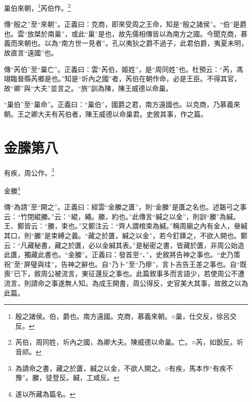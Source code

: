 巢伯來朝，\footnote{殷之諸侯。伯，爵也。南方遠國。克商，慕義來朝。○巢，仕交反，徐呂交反。}芮伯作。\footnote{芮伯，周同姓，圻內之國，為卿大夫。陳威德以命巢。亡。○芮，如銳反。圻音祁。}


{\noindent\zhuan{}\fzbyks 傳“殷之”至“來朝”。正義曰：克商，即來受周之王命，知是“殷之諸侯”。“伯”是爵也。雲“放桀於南巢”，或此“巢”是也，故先儒相傳皆以為南方之國。今聞克商，慕義而來朝也。以為“南方世一見者”。孔以夷狄之爵不過子，此君伯爵，夷夏未明，故直言“遠國”也。 \par}

{\noindent\zhuan{}\fzbyks 傳“芮伯”至“巢亡”。正義曰：雲“芮伯，姬姓”，是“周同姓”也。杜預云：“芮，馮翊臨晉縣芮鄉是也。”知是“圻內之國”者，芮伯在朝作命，必是王臣。不得其官，故“卿”與“大夫”並言之。“旅”訓為陳，陳王威德以命巢。 \par}

{\noindent\shu{}\fzkt “巢伯”至“巢命”。正義曰：“巢伯”，國爵之君，南方遠國也。以克商，乃慕義來朝。王之卿大夫有芮伯者，陳王威德以命巢君。史敘其事，作之篇。 \par}

\section{金縢第八}


有疾，周公作。\footnote{為請命之書，藏之於匱，緘之以金，不欲人開之。○有疾，馬本作“有疾不豫”。縢，徒登反。緘，工咸反。}

金縢\footnote{遂以所藏為篇名。}

{\noindent\zhuan{}\fzbyks 傳“為請”至“開之”。正義曰：經雲“金縢之匱”，則“金縢”是匱之名也。述韔弓之事云：“竹閉緄縢。”云：“緄，繩。縢，約也。”此傳言“緘之以金”，則訓“縢”為緘。王、鄭皆云：“縢，束也。”又鄭注云：“齊人謂棺束為緘。”稱周廟之內有金人，叄緘其口，則“縢”是束縛之義。“藏之於匱，緘之以金”，若今釘鐷之，不欲人開也。鄭云：“凡藏秘書，藏之於匱，必以金緘其表。”是秘密之書，皆藏於匱，非周公始造此匱，獨藏此書也。“金縢”。正義曰：發首至“、”，史敘將告神之事也。“史乃策祝”至“屏璧與珪”，告神之辭也。自“乃卜”至“乃瘳”，言卜吉告王差之事也。自“既喪”已下，敘周公被流言，東征還反之事也。此篇敘事多而言語少，若使周公不遭流言，則請命之事遂無人知。為成王開書，周公得反，史官美大其事，故敘之以為此篇。 \par}


